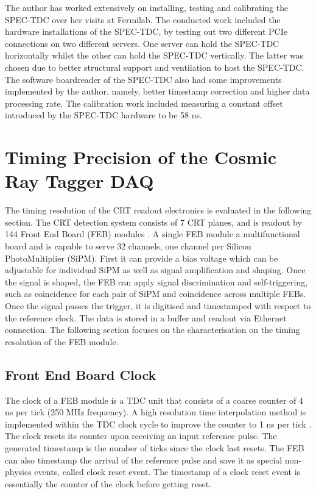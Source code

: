 The author has worked extensively on installing, testing and calibrating the SPEC-TDC over her visits at Fermilab.
The  conducted work included the hardware installations of the SPEC-TDC, by testing out two different PCIe connections on two different servers. 
One server can hold the SPEC-TDC horizontally whilst the other can hold the SPEC-TDC vertically. 
The latter was chosen due to better structural support and ventilation to host the SPEC-TDC.
The software boardreader of the SPEC-TDC also had some improvements implemented by the author, namely, better timestamp correction and higher data processing rate.
The calibration work included measuring a constant offset introduced by the SPEC-TDC hardware to be 58 ns.

\section{Timing Precision of the Cosmic Ray Tagger DAQ}
\label{section5.3}

The timing resolution of the CRT readout electronics is evaluated in the following section.
The CRT detection system consists of 7 CRT planes, and is readout by 144 Front End Board (FEB) modules \cite{crt_note}. 
A single FEB module a multifunctional board and is capable to serve 32 channels, one channel per Silicon PhotoMultiplier (SiPM). 
First it can provide a bias voltage which can be adjustable for individual SiPM as well as signal amplification and shaping.
Once the signal is shaped, the FEB can apply signal discrimination and self-triggering, such as coincidence for each pair of SiPM and coincidence across multiple FEBs.
Once the signal passes the trigger, it is digitised and timestamped with respect to the reference clock.
The data is stored in a buffer and readout via Ethernet connection.
The following section focuses on the characterisation on the timing resolution of the FEB module.


\subsection{Front End Board Clock}

The clock of a FEB module is a TDC unit that consists of a coarse counter of 4 ns per tick (250 MHz frequency). 
A high resolution time interpolation method is implemented within the TDC clock cycle to improve the counter to 1 ns per tick \cite{crt_clock}.
The clock resets its counter upon receiving an input reference pulse.  
The generated timestamp is the number of ticks since the clock last resets.
The FEB can also timestamp the arrival of the reference pulse and save it as special non-physics events, called clock reset event.
The timestamp of a clock reset event is essentially the counter of the clock before getting reset.

